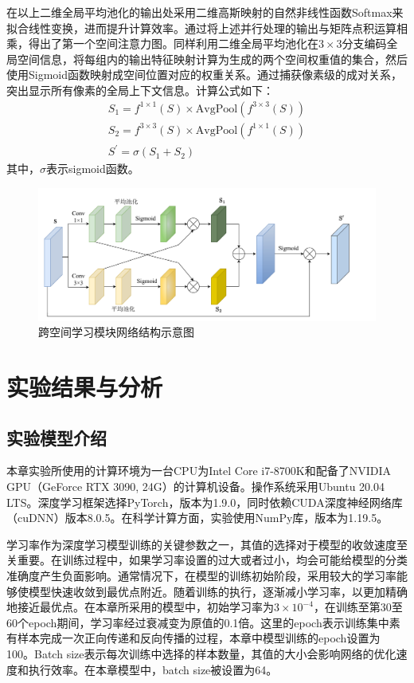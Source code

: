 在以上二维全局平均池化的输出处采用二维高斯映射的自然非线性函数Softmax来拟合线性变换，进而提升计算效率。通过将上述并行处理的输出与矩阵点积运算相乘，得出了第一个空间注意力图。同样利用二维全局平均池化在$3\times 3$分支编码全局空间信息，将每组内的输出特征映射计算为生成的两个空间权重值的集合，然后使用Sigmoid函数映射成空间位置对应的权重关系。通过捕获像素级的成对关系，突出显示所有像素的全局上下文信息。计算公式如下：
\begin{gather}
    S_1=f^{1\times 1}\left( S \right) \times \mathrm{AvgPool}\left( f^{3\times 3}\left( S \right) \right)
    \\
    S_2=f^{3\times 3}\left( S \right) \times \mathrm{AvgPool}\left( f^{1\times 1}\left( S \right) \right)
    \\
    S^{\prime}=\sigma \left( S_1+S_2 \right)
\end{gather}
其中，$\sigma$表示sigmoid函数。

\begin{figure}[ht!]
    \centering
    \includegraphics[width=14cm]{pic/chapter3/跨空间学习.pdf}
    \caption{跨空间学习模块网络结构示意图}
    \label{DPEN_CSL}
\end{figure}


\section{实验结果与分析}
\subsection{实验模型介绍}
\label{sec:实验模型介绍}
本章实验所使用的计算环境为一台CPU为Intel Core i7-8700K和配备了NVIDIA GPU（GeForce RTX 3090, 24G）的计算机设备。操作系统采用Ubuntu 20.04 LTS。深度学习框架选择PyTorch，版本为1.9.0，同时依赖CUDA深度神经网络库（cuDNN）版本8.0.5。在科学计算方面，实验使用NumPy库，版本为1.19.5。

学习率作为深度学习模型训练的关键参数之一，其值的选择对于模型的收敛速度至关重要。在训练过程中，如果学习率设置的过大或者过小，均会可能给模型的分类准确度产生负面影响。通常情况下，在模型的训练初始阶段，采用较大的学习率能够使模型快速收敛到最优点附近。随着训练的执行，逐渐减小学习率，以更加精确地接近最优点。在本章所采用的模型中，初始学习率为$3\times 10^{-4}$，在训练至第30至60个epoch期间，学习率经过衰减变为原值的0.1倍。这里的epoch表示训练集中素有样本完成一次正向传递和反向传播的过程，本章中模型训练的epoch设置为100。Batch size表示每次训练中选择的样本数量，其值的大小会影响网络的优化速度和执行效率。在本章模型中，batch size被设置为64。

